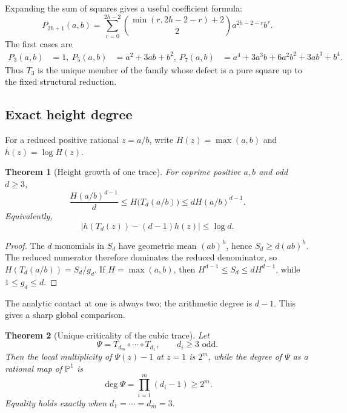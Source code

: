 \documentclass[11pt,oneside]{article}
\newtheorem{theorem}{Theorem}[section]
\theoremstyle{definition}
\theoremstyle{remark}
\begin{document}
Expanding the sum of squares gives a useful coefficient formula:
\begin{equation}
 P_{2h+1}(a,b)=
 \sum_{r=0}^{2h-2}
 \binom{\min(r,2h-2-r)+2}{2}a^{2h-2-r}b^r.
 \label{eq:Pd-coefficients}
\end{equation}
The first cases are
\begin{align}
 P_3(a,b)&=1,\label{eq:P3}\
 P_5(a,b)&=a^2+3ab+b^2,\label{eq:P5}\
 P_7(a,b)&=a^4+3a^3b+6a^2b^2+3ab^3+b^4.\label{eq:P7}
\end{align}
Thus \(T_3\) is the unique member of the family whose defect is a pure square up to the
fixed structural reduction.

\subsection{Exact height degree}

For a reduced positive rational \(z=a/b\), write
\(H(z)=\max(a,b)\) and \(h(z)=\log H(z)\).

\begin{theorem}[Height growth of one trace]
\label{thm:height-growth}
For coprime positive \(a,b\) and odd \(d\ge3\),
\begin{equation}
 \frac{H(a/b)^{d-1}}d
 \le H\bigl(T_d(a/b)\bigr)
 \le dH(a/b)^{d-1}.
 \label{eq:height-growth}
\end{equation}
Equivalently,
\begin{equation}
 \left|h(T_d(z))-(d-1)h(z)\right|\le\log d.
 \label{eq:log-height-growth}
\end{equation}
\end{theorem}

\begin{proof}
The \(d\) monomials in \(S_d\) have geometric mean \((ab)^h\), hence
\(S_d\ge d(ab)^h\).  The reduced numerator therefore dominates the reduced denominator, so
\(H(T_d(a/b))=S_d/g_d\).  If \(H=\max(a,b)\), then
\(H^{d-1}\le S_d\le dH^{d-1}\), while \(1\le g_d\le d\).
\end{proof}

The analytic contact at one is always two; the arithmetic degree is \(d-1\).  This gives a
sharp global comparison.

\begin{theorem}[Unique criticality of the cubic trace]
\label{thm:criticality}
Let
\[
 \Psi=T_{d_m}\circ\cdots\circ T_{d_1},
 \qquad d_i\ge3\text{ odd}.
\]
Then the local multiplicity of \(\Psi(z)-1\) at \(z=1\) is \(2^m\), while the degree of
\(\Psi\) as a rational map of \(\mathbb P^1\) is
\begin{equation}
 \deg\Psi=\prod_{i=1}^{m}(d_i-1)\ge2^m.
 \label{eq:composition-degree}
\end{equation}
Equality holds exactly when \(d_1=\cdots=d_m=3\).
\end{theorem}
\end{document}
